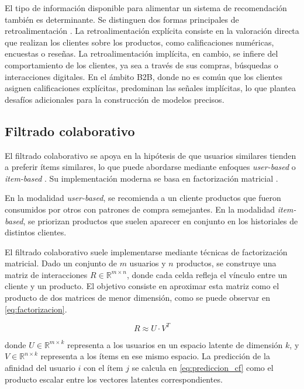 El tipo de información disponible para alimentar un sistema de recomendación también es determinante. Se distinguen dos formas principales de retroalimentación \cite{ARTICLE:Hu2008}. La retroalimentación explícita consiste en la valoración directa que realizan los clientes sobre los productos, como calificaciones numéricas, encuestas o reseñas. La retroalimentación implícita, en cambio, se infiere del comportamiento de los clientes, ya sea a través de sus compras, búsquedas o interacciones digitales. En el ámbito B2B, donde no es común que los clientes asignen calificaciones explícitas, predominan las señales implícitas, lo que plantea desafíos adicionales para la construcción de modelos precisos.

\subsection{Filtrado colaborativo}

El filtrado colaborativo se apoya en la hipótesis de que usuarios similares tienden a preferir ítems similares, lo que puede abordarse mediante enfoques \textit{user-based} o \textit{item-based} \cite{ARTICLE:Sarwar2001}. Su implementación moderna se basa en factorización matricial \cite{ARTICLE:Koren2009}.

En la modalidad \textit{user-based}, se recomienda a un cliente productos que fueron consumidos por otros con patrones de compra semejantes. En la modalidad \textit{item-based}, se priorizan productos que suelen aparecer en conjunto en los historiales de distintos clientes. 

El filtrado colaborativo suele implementarse mediante técnicas de factorización matricial. Dado un conjunto de $m$ usuarios y $n$ productos, se construye una matriz de interacciones $R \in \mathbb{R}^{m \times n}$, donde cada celda refleja el vínculo entre un cliente y un producto. El objetivo consiste en aproximar esta matriz como el producto de dos matrices de menor dimensión, como se puede observar en \ref{eq:factorizacion}.

\begin{equation}
\label{eq:factorizacion}
R \approx U \cdot V^T
\end{equation}

donde $U \in \mathbb{R}^{m \times k}$ representa a los usuarios en un espacio latente de dimensión $k$, y $V \in \mathbb{R}^{n \times k}$ representa a los ítems en ese mismo espacio. La predicción de la afinidad del usuario $i$ con el ítem $j$ se calcula en \ref{eq:prediccion_cf} como el producto escalar entre los vectores latentes correspondientes.

